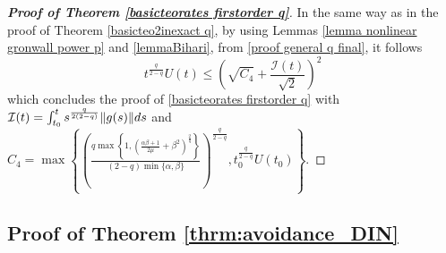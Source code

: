 \documentclass[reqno]{amsart}
\theoremstyle{plain}
\theoremstyle{definition}
\theoremstyle{remark}
\DeclarePairedDelimiter{\norm}{\lVert}{\rVert}	%
\newcommand{\Ib}{\mathcal{I}}
\begin{document}
\begin{proof}[\textbf{Proof of Theorem \ref{basicteorates firstorder q}}]
In the same way as in the proof of Theorem \ref{basicteo2inexact q}, by using Lemmas \ref{lemma nonlinear gronwall power p} and \ref{lemmaBihari}, from \eqref{proof general q final}, it follows
\begin{equation}
	t^{\frac{q}{2-q}}U(t) \leq \left(\sqrt{C_{4}}+\frac{\Ib(t)}{\sqrt{2}}\right)^{2} 
\end{equation}
which concludes the proof of \cref{basicteorates firstorder q}
with $\Ib(t)=\int_{t_{0}}^{t}s^{\frac{q}{2(2-q)}}\norm{g(s)}ds$ and\\ $C_{4} = \max\left\{\left(\frac{q\max\left\{1,\left(\frac{\alpha\beta+1}{2\mu}+\beta^{2}\right)^{\frac{2}{q}}\right\}}{(2-q)\min\{\alpha,\beta\}}\right)^{\frac{q}{2-q}} , t_{0}^{\frac{q}{2-q}}U(t_{0})\right\}$.	
\end{proof}




\subsection{Proof of Theorem \ref{thrm:avoidance_DIN}}
\label{subsec:avoidance_proof}
\end{document}
